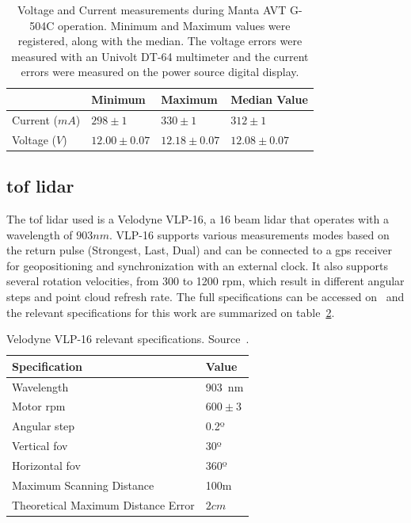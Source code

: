 	
\begin{table}[H]
	\centering
	\renewcommand{\arraystretch}{1.2}
	\renewcommand{\tabcolsep}{0.45cm}
	\begin{tabular}{@{}llll@{}}
		\toprule
					  & Minimum & Maximum & Median Value \\ \midrule
		Current ($mA$) & $298 \pm 1$ & $330\pm 1$ & $312 \pm 1$ \\
		Voltage ($V$)  & $12.00\pm 0.07 $ & $12.18\pm 0.07$ & $12.08\pm0.07$ \\
		\bottomrule
	\end{tabular}
	\centering
	\caption{Voltage and Current measurements during Manta AVT G-504C operation. Minimum and Maximum values were registered, along with the median. The voltage errors were measured with an Univolt DT-64 multimeter and the current errors were measured on the power source digital display.}
	\label{tab:manta-power}
\end{table}



\subsection{\ac{tof} \ac{lidar}}
The \ac{tof} \ac{lidar} used is a Velodyne VLP-16\texttrademark, a 16 beam \ac{lidar} that operates with a wavelength of $903 nm$. VLP-16 supports various measurements modes based on the return pulse (Strongest, Last, Dual) and can be connected to a \ac{gps} receiver for geopositioning and synchronization with an external clock. It also supports several rotation velocities, from 300 to 1200 \ac{rpm}, which result in different angular steps and point cloud refresh rate. The full specifications can be accessed on~\cite{VLP16} and the relevant specifications for this work are summarized on table~\ref{tab:vlp16-specs}.

\begin{table}[H]
	\renewcommand{\arraystretch}{1.2}
	\centering
	\begin{tabular}{@{}p{8.3cm}l@{}}
		\toprule
		Specification & Value \\ \midrule
		Wavelength    & 903 nm \\
		Motor \acs{rpm} & $600 \pm 3$ \\
		Angular step & 0.2º \\
		Vertical \ac{fov} & 30º \\
		Horizontal \ac{fov} & 360º \\
		Maximum Scanning Distance & 100m \\
		Theoretical Maximum Distance Error & $2 cm$ \\
		\bottomrule
	\end{tabular}
	\caption{Velodyne VLP-16 relevant specifications. Source~\cite{VLP16}.}
	\label{tab:vlp16-specs}
\end{table}


